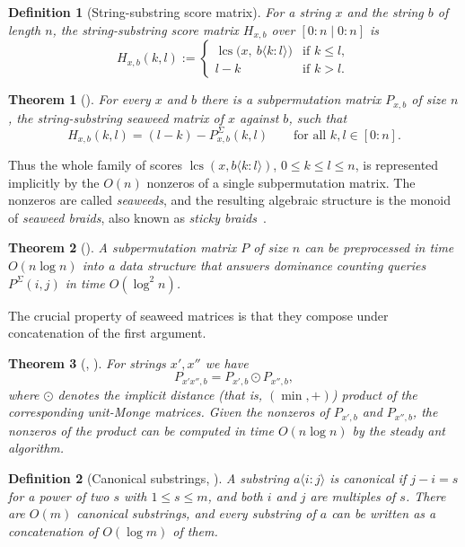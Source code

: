 \documentclass[10pt]{article}
\newtheorem{definition}{Definition}
\newtheorem{theorem}{Theorem}
\newcommand{\lcs}{\operatorname{lcs}}
\begin{document}
\begin{definition}[String-substring score matrix]\label{def:H}
For a string $x$ and the string $b$ of length $n$, the
\emph{string-substring score matrix} $H_{x,b}$ over $[0:n\mid 0:n]$ is
\[
H_{x,b}(k,l):=
\begin{cases}
\lcs\bigl(x,\ b\langle k:l\rangle\bigr) & \text{if } k\le l,\\
l-k & \text{if } k>l.
\end{cases}
\]
\end{definition}

\begin{theorem}[{\cite[Theorem 4.10, Definition 4.11]{TiskinArXiv}}]\label{thm:seaweed}
For every $x$ and $b$ there is a subpermutation matrix $P_{x,b}$ of size $n$,
the \emph{string-substring seaweed matrix} of $x$ against $b$, such that
\[
H_{x,b}(k,l)=(l-k)-P^{\Sigma}_{x,b}(k,l)
\qquad\text{for all } k,l\in[0:n].
\]
\end{theorem}

Thus the whole family of scores $\lcs(x,b\langle k:l\rangle)$, $0\le k\le l\le
n$, is represented implicitly by the $O(n)$ nonzeros of a single
subpermutation matrix. The nonzeros are called \emph{seaweeds}, and the
resulting algebraic structure is the monoid of \emph{seaweed braids}, also
known as \emph{sticky braids}~\cite[Chapter 3]{TiskinArXiv}.

\begin{theorem}[{\cite[Theorem 2.15]{TiskinArXiv}}]\label{thm:rangetree}
A subpermutation matrix $P$ of size $n$ can be preprocessed in time
$O(n\log n)$ into a data structure that answers dominance counting queries
$P^{\Sigma}(i,j)$ in time $O(\log^2 n)$.
\end{theorem}

The crucial property of seaweed matrices is that they compose under
concatenation of the first argument.

\begin{theorem}[{\cite[Theorems 4.19, 4.21]{TiskinArXiv}}, \cite{Tiskin15}]\label{thm:steadyant}
For strings $x',x''$ we have
\[
P_{x'x'',b}=P_{x',b}\odot P_{x'',b},
\]
where $\odot$ denotes the implicit distance (that is, $(\min,+)$) product of
the corresponding unit-Monge matrices. Given the nonzeros of $P_{x',b}$ and
$P_{x'',b}$, the nonzeros of the product can be computed in time
$O(n\log n)$ by the \emph{steady ant} algorithm.
\end{theorem}

\begin{definition}[Canonical substrings, {\cite[Algorithm 11.2]{TiskinArXiv}}]\label{def:canonical}
A substring $a\langle i:j\rangle$ is \emph{canonical} if $j-i=s$ for a power of
two $s$ with $1\le s\le m$, and both $i$ and $j$ are multiples of $s$. There
are $O(m)$ canonical substrings, and every substring of $a$ can be written as a
concatenation of $O(\log m)$ of them.
\end{definition}
\end{document}

